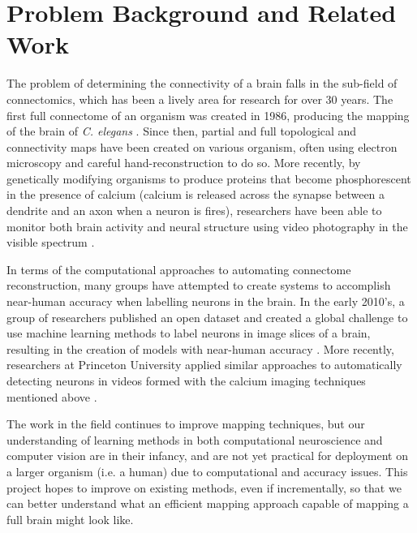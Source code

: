 \chapter{Problem Background and Related Work}


The problem of determining the connectivity of a brain falls in the sub-field of connectomics, which has been a lively area for research for over 30 years. The first full connectome of an organism was created in 1986, producing the mapping of the brain of \textit{C. elegans} \cite{White1986}. Since then, partial and full topological and connectivity maps have been created on various organism, often using electron microscopy and careful hand-reconstruction to do so. More recently, by genetically modifying organisms to produce proteins that become phosphorescent in the presence of calcium (calcium is released across the synapse between a dendrite and an axon when a neuron is fires), researchers have been able to monitor both brain activity and neural structure using video photography in the visible spectrum \cite{Nguyen2015}.

In terms of the computational approaches to automating connectome reconstruction, many groups have attempted to create systems to accomplish near-human accuracy when labelling neurons in the brain. In the early 2010's, a group of researchers published an open dataset and created a global challenge to use machine learning methods to label neurons in image slices of a brain, resulting in the creation of models with near-human accuracy \cite{Arganda-Carreras2015}. More recently, researchers at Princeton University applied similar approaches to automatically detecting neurons in videos formed with the calcium imaging techniques mentioned above \cite{Apthorpe2016}.

The work in the field continues to improve mapping techniques, but our understanding of learning methods in both computational neuroscience and computer vision are in their infancy, and are not yet practical for deployment on a larger organism (i.e. a human) due to computational and accuracy issues. This project hopes to improve on existing methods, even if incrementally, so that we can better understand what an efficient mapping approach capable of mapping a full brain might look like.